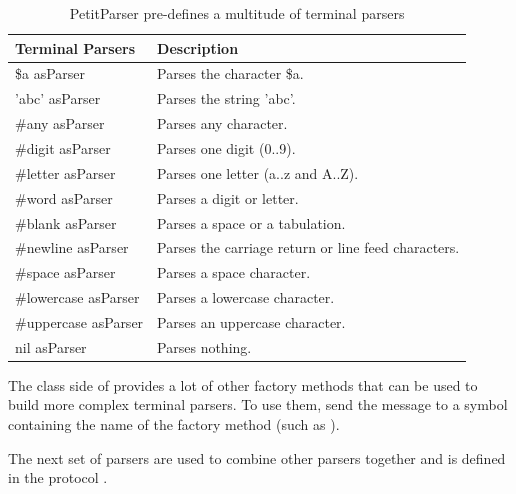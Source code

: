 \documentclass[a4paper,10pt,twoside]{book}
\begin{document}
\begin{table}
  \centering
  \begin{tabular}{ll}
    \textbf{Terminal Parsers} & \textbf{Description}                                \\
    \midrule
    \$a asParser              & Parses the character \$a.                           \\
    'abc' asParser            & Parses the string 'abc'.                            \\
    \#any asParser            & Parses any character.                               \\
    \#digit asParser          & Parses one digit (0..9).                            \\
    \#letter asParser         & Parses one letter (a..z and A..Z).                  \\
    \#word asParser           & Parses a digit or letter.                           \\
    \#blank asParser          & Parses a space or a tabulation.                     \\
    \#newline asParser        & Parses the carriage return or line feed characters. \\
    \#space asParser          & Parses a space character.                           \\
    \#lowercase asParser      & Parses a lowercase character.                       \\
    \#uppercase asParser      & Parses an uppercase character.                      \\
    nil asParser	      & Parses nothing.                                     \\
  \end{tabular}
  \caption{PetitParser pre-defines a multitude of terminal parsers}
  \label{tab:terminal-parsers}
\end{table}

The class side of  provides a lot of
other factory methods that can be used to build more complex terminal
parsers. To use them, send the message  to a symbol
containing the name of the factory method (such as 
).

The next set of parsers are used to combine other parsers together and
is defined in the protocol .
\end{document}
